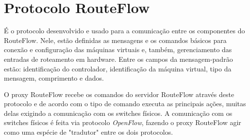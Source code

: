 \section{Protocolo RouteFlow}

É o protocolo desenvolvido e usado para a comunicação entre
os componentes do RouteFlow. Nele, estão definidas as
mensagens e os comandos básicos para conexão e configuração
das máquinas virtuais e, também, gerenciamento das entradas
de roteamento em hardware. Entre os campos da
mensagem-padrão estão: identificação do controlador,
identificação da máquina virtual, tipo da mensagem,
comprimento e dados. 

O proxy RouteFlow recebe os comandos do
servidor RouteFlow através deste protocolo e de acordo com o
tipo de comando executa as principais ações, muitas delas
exigindo a comunicação com os switches físicos. A
comunicação com os switches físicos é feita via protocolo
\textit{OpenFlow}, fazendo o proxy RouteFlow agir como
uma espécie de "tradutor" entre os dois protocolos.
